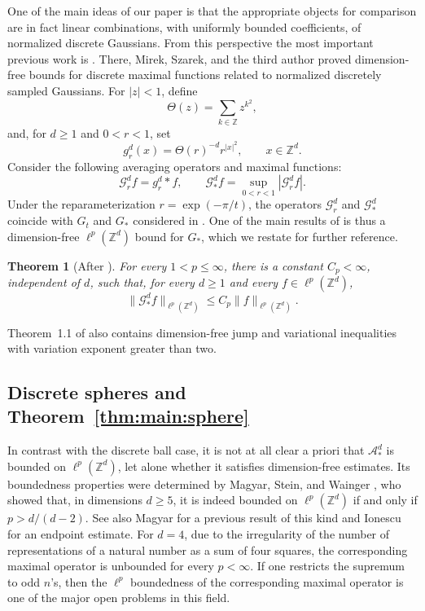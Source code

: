 \documentclass{article}
\newcommand{\Z}{\mathbb Z}
\theoremstyle{plain}
\newtheorem{theorem}{Theorem}
\numberwithin{equation}{section}
\begin{document}
One of the main ideas of our paper is that the appropriate objects for comparison are in fact linear combinations, with uniformly bounded coefficients, of normalized discrete Gaussians. From this perspective the most important previous work is \cite{MirekSzarekWrobelGaussians}. There, Mirek, Szarek, and the third author proved dimension-free bounds for discrete maximal functions related to normalized discretely sampled Gaussians.
For \(|z|<1\), define
\[
 \Theta(z)=\sum_{k\in\mathbb Z}z^{k^2},
\]
and, for \(d\geq 1\) and \(0<r<1\), set
\[
 g_r^d(x)=\Theta(r)^{-d}r^{|x|^2},
 \qquad x\in\mathbb Z^d.
\]
Consider the following averaging operators and maximal functions:
\[
 \mathcal G_r^df=g_r^d*f,
 \qquad
 \mathcal G_*^df=\sup_{0<r<1}|\mathcal G_r^df|.
\]
Under the reparameterization $r=\exp(-\pi/t)$, the operators $\mathcal G_r^d$ and $\mathcal G_*^d$ coincide with $G_t$ and $G_*$ considered in \cite{MirekSzarekWrobelGaussians}. One of the main results of \cite{MirekSzarekWrobelGaussians} is thus a dimension-free $\ell^p(\Z^d)$ bound for $G_*$, which we restate for further reference.
\begin{theorem}[{After \cite[Theorem~1.1, (1.5)]{MirekSzarekWrobelGaussians}}]\label{thm:gaussian}
For every \(1<p\leq\infty\), there is a constant \(C_p<\infty\), independent
of \(d\), such that, for every \(d\geq 1\) and every
\(f\in\ell^p(\mathbb Z^d)\),
\[
 \|\mathcal G_*^df\|_{\ell^p(\mathbb Z^d)}
 \leq C_p\|f\|_{\ell^p(\mathbb Z^d)}.
\]
\end{theorem}
\noindent Theorem~1.1 of \cite{MirekSzarekWrobelGaussians} also contains dimension-free
jump and variational inequalities with variation
exponent greater than two.

\subsection{Discrete spheres and Theorem~\ref{thm:main:sphere}}

In contrast with the discrete ball case, it is not at all clear a priori that $\mathcal A_*^d$ is bounded on $\ell^p(\Z^d)$, let alone whether it satisfies dimension-free estimates. Its boundedness properties were determined by Magyar, Stein, and Wainger \cite{MagyarSteinWainger}, who showed that, in dimensions $d\geq 5$, it is indeed bounded on $\ell^p(\Z^d)$ if and only if $p>d/(d-2)$. See also Magyar \cite{Magyar} for a previous result of this kind and Ionescu \cite{Ionescu} for an endpoint estimate. For $d=4$, due to the irregularity of the number of representations of a natural number as a sum of four squares, the corresponding maximal operator is unbounded for every $p<\infty$. If one restricts the supremum to odd $n$'s, then the $\ell^p$ boundedness of the corresponding maximal operator is one of the major open problems in this field.
\end{document}
